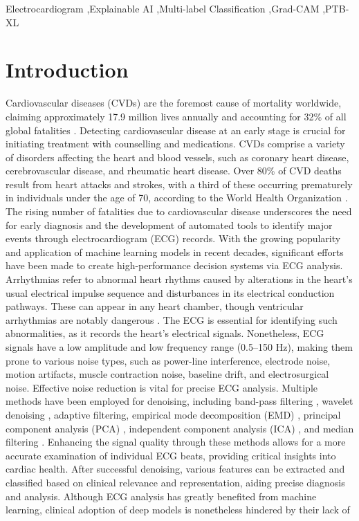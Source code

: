 \documentclass[a4paper,fleqn]{cas-dc}
\begin{document}
\begin{keywords}
Electrocardiogram \sep Explainable AI \sep Multi-label Classification \sep Grad-CAM \sep PTB-XL
\end{keywords}

\maketitle

\section{Introduction}
\label{sec:intro}
Cardiovascular diseases (CVDs) are the foremost cause of mortality worldwide, claiming approximately 17.9 million lives annually and accounting for 32\% of all global fatalities \cite{who}. Detecting cardiovascular disease at an early stage is crucial for initiating treatment with counselling and medications. CVDs comprise a variety of disorders affecting the heart and blood vessels, such as coronary heart disease, cerebrovascular disease, and rheumatic heart disease. Over 80\% of CVD deaths result from heart attacks and strokes, with a third of these occurring prematurely in individuals under the age of 70, according to the World Health Organization \cite{who}. The rising number of fatalities due to cardiovascular disease underscores the need for early diagnosis and the development of automated tools to identify major events through electrocardiogram (ECG) records. With the growing popularity and application of machine learning models in recent decades, significant efforts have been made to create high-performance decision systems via ECG analysis. Arrhythmias refer to abnormal heart rhythms caused by alterations in the heart's usual electrical impulse sequence and disturbances in its electrical conduction pathways. These can appear in any heart chamber, though ventricular arrhythmias are notably dangerous \cite{label2}. The ECG is essential for identifying such abnormalities, as it records the heart's electrical signals. Nonetheless, ECG signals have a low amplitude and low frequency range (0.5--150 Hz), making them prone to various noise types, such as power-line interference, electrode noise, motion artifacts, muscle contraction noise, baseline drift, and electrosurgical noise. Effective noise reduction is vital for precise ECG analysis. Multiple methods have been employed for denoising, including band-pass filtering \cite{shang2018removal}, wavelet denoising \cite{rodenas2018efficient}, adaptive filtering, empirical mode decomposition (EMD) \cite{dai2021denoising, xin2014ecg}, principal component analysis (PCA) \cite{romero2010pca}, independent component analysis (ICA) \cite{he2006application}, and median filtering \cite{xin2014ecg}. Enhancing the signal quality through these methods allows for a more accurate examination of individual ECG beats, providing critical insights into cardiac health. After successful denoising, various features can be extracted and classified based on clinical relevance and representation, aiding precise diagnosis and analysis. Although ECG analysis has greatly benefited from machine learning, clinical adoption of deep models is nonetheless hindered by their lack of 
\end{document}
